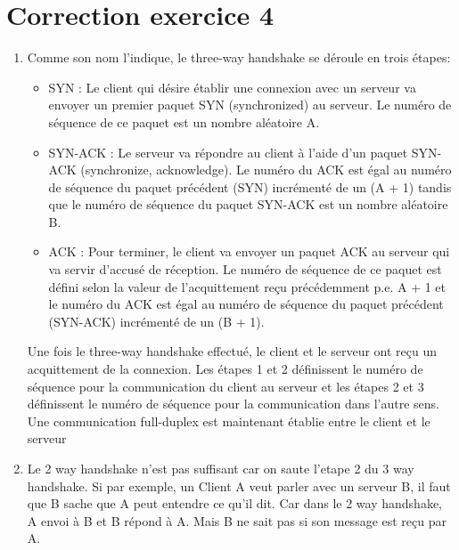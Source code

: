 \documentclass[a4paper, 11pt, titlepage]{article}
\begin{document}
\section{Correction exercice 4}
\begin{enumerate}[label=(\alph*)]
\item
Comme son nom l'indique, le three-way handshake se déroule en trois étapes:

\begin{itemize}

\item SYN : Le client qui désire établir une connexion avec un serveur va envoyer un premier paquet SYN (synchronized) au serveur. Le numéro de séquence de ce paquet est un nombre aléatoire A.
\item SYN-ACK : Le serveur va répondre au client à l'aide d'un paquet SYN-ACK (synchronize, acknowledge). Le numéro du ACK est égal au numéro de séquence du paquet précédent (SYN) incrémenté de un (A + 1) tandis que le numéro de séquence du paquet SYN-ACK est un nombre aléatoire B.
\item ACK : Pour terminer, le client va envoyer un paquet ACK au serveur qui va servir d'accusé de réception. Le numéro de séquence de ce paquet est défini selon la valeur de l'acquittement reçu précédemment p.e. A + 1 et le numéro du ACK est égal au numéro de séquence du paquet précédent (SYN-ACK) incrémenté de un (B + 1).
\end{itemize}

Une fois le three-way handshake effectué, le client et le serveur ont reçu un acquittement de la connexion. Les étapes 1 et 2 définissent le numéro de séquence pour la communication du client au serveur et les étapes 2 et 3 définissent le numéro de séquence pour la communication dans l'autre sens. Une communication full-duplex est maintenant établie entre le client et le serveur


\item
Le 2 way handshake n'est pas suffisant car on saute l'etape 2 du 3 way handshake. Si par exemple, un Client A veut parler avec un serveur B, il faut que B sache que A peut entendre ce qu'il dit. Car dans le 2 way handshake, A envoi à B et B répond à A. Mais B ne sait pas si son message est reçu par A.

\end{enumerate}
\end{document}
